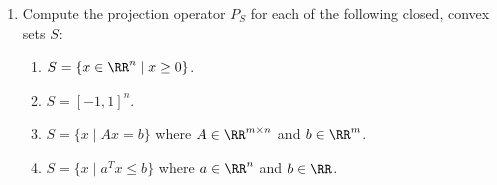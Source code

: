 \documentclass[11pt]{article}
\begin{document}

\begin{enumerate}

\item Compute the projection operator $P_S$ for each of the following closed, convex sets $S$:
\begin{enumerate}
\item $S = \{x \in \RR^n \mid x \geq 0\}$.
\item $S = [-1, 1]^n$.
\item $S = \{x \mid Ax = b\}$ where $A \in \RR^{m \times n}$ and $b \in \RR^m$.
\item $S = \{x \mid a^Tx \leq b\}$ where $a \in \RR^n $ and $b \in \RR$.
\end{enumerate}


\end{enumerate}
\end{document}
